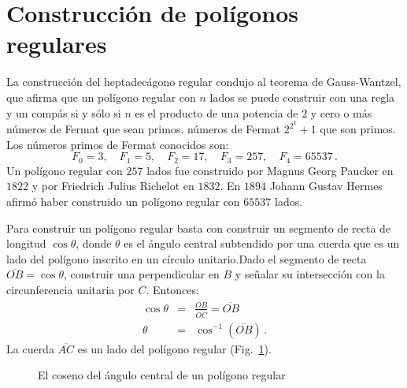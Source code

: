 \section{Construcción de polígonos regulares}\label{s.hept-regular}

La construcción del heptadecágono regular condujo al teorema de Gauss-Wantzel, que afirma que un polígono regular con $n$ lados se puede construir con una regla y un compás si y sólo si $n$ es el producto de una potencia de $2$ y cero o más números de Fermat que sean primos. números de Fermat $2^{2^k}+1$ que son primos. Los números primos de Fermat conocidos son:
\[
F_0=3,\quad F_1=5,\quad F_2=17,\quad F_3=257,\quad F_4=65537\,.
\]
Un polígono regular con $257$ lados fue construido por Magnus Georg Paucker en $1822$ y por Friedrich Julius Richelot en $1832$. En $1894$ Johann Gustav Hermes afirmó haber construido un polígono regular con $65537$ lados.

Para construir un polígono regular basta con construir un segmento de recta de longitud $\cos \theta$, donde $\theta$ es el ángulo central subtendido por una cuerda que es un lado del polígono inscrito en un círculo unitario.Dado el segmento de recta $\overline{OB}=\cos\theta$, construir una perpendicular en $B$ y señalar su intersección con la circunferencia unitaria por $C$. Entonces:
\begin{eqnarray*}
\cos \theta&=&\displaystyle\frac{\overline{OB}}{\overline{OC}}=\overline{OB}\\
\theta &=& \cos^{-1} (\overline{OB})\,.
\end{eqnarray*}
La cuerda $\overline{AC}$ es un lado del polígono regular (Fig.~\ref{f.hept-central1}).
\begin{figure}[b]
\begin{center}
\end{center}
\caption{El coseno del ángulo central de un polígono regular}\label{f.hept-central1}
\end{figure}

